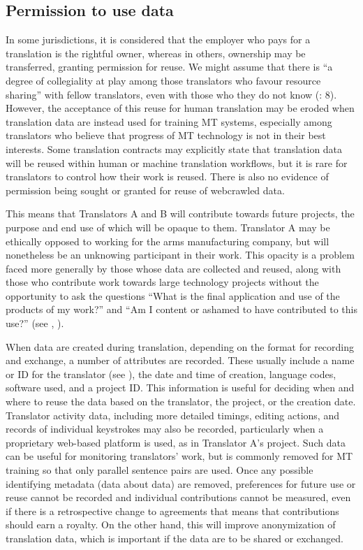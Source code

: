 \documentclass[output=paper]{langscibook}
\begin{document}
\subsection{Permission to use data} \label{sec:moorkens:2.3}

In some jurisdictions, it is considered that the employer who pays for a translation is the rightful owner, whereas in others, ownership may be transferred, granting permission for reuse. We might assume that there is “a degree of collegiality at play among those translators who favour resource sharing” with fellow translators, even with those who they do not know (\citealt{MoorkensLewis2019Jostrans}: 8). However, the acceptance of this reuse for human translation may be eroded when translation data are instead used for training MT systems, especially among translators who believe that progress of MT technology is not in their best interests. Some translation contracts may explicitly state that translation data will be reused within human or machine translation workflows, but it is rare for translators to control how their work is reused. There is also no evidence of permission being sought or granted for reuse of webcrawled data.

This means that Translators A and B will contribute towards future projects, the purpose and end use of which will be opaque to them. Translator A may be ethically opposed to working for the arms manufacturing company, but will nonetheless be an unknowing participant in their work. This opacity is a problem faced more generally by those whose data are collected and reused, along with those who contribute work towards large technology projects without the opportunity to ask the questions “What is the final application and use of the products of my work?” and “Am I content or ashamed to have contributed to this use?” (see \citealt{Moorkens2020}, \citealt{Weizenbaum1986}).

When data are created during translation, depending on the format for recording and exchange, a number of attributes are recorded. These usually include a name or ID for the translator (see ), the date and time of creation, language codes, software used, and a project ID. This information is useful for deciding when and where to reuse the data based on the translator, the project, or the creation date. Translator activity data, including more detailed timings, editing actions, and records of individual keystrokes may also be recorded, particularly when a proprietary web-based platform is used, as in Translator A’s project. Such data can be useful for monitoring translators’ work, but is commonly removed for MT training so that only parallel sentence pairs are used. Once any possible identifying metadata (data about data) are removed, preferences for future use or reuse cannot be recorded and individual contributions cannot be measured, even if there is a retrospective change to agreements that means that contributions should earn a royalty. On the other hand, this will improve anonymization of translation data, which is important if the data are to be shared or exchanged.
\end{document}
